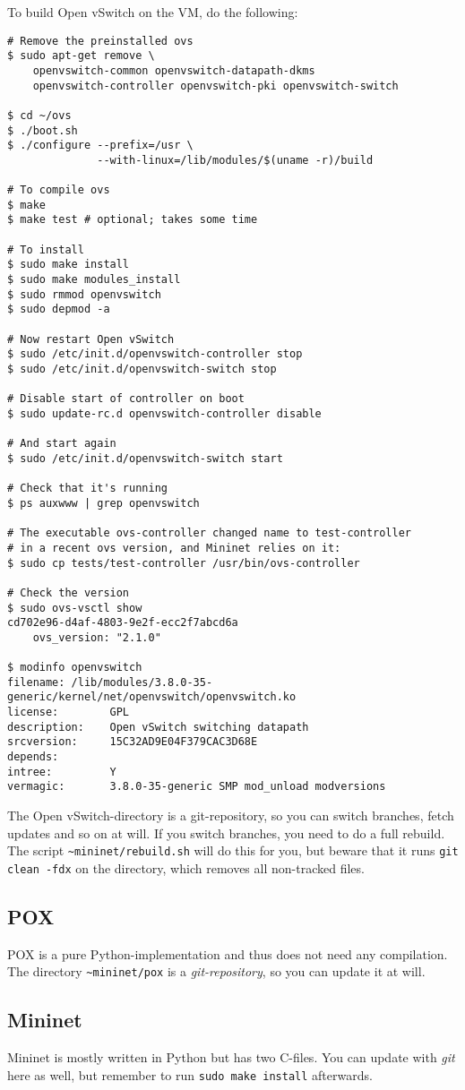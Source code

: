 To build Open vSwitch on the VM, do the following:

\begin{Verbatim}
# Remove the preinstalled ovs
$ sudo apt-get remove \
    openvswitch-common openvswitch-datapath-dkms
    openvswitch-controller openvswitch-pki openvswitch-switch

$ cd ~/ovs
$ ./boot.sh
$ ./configure --prefix=/usr \
              --with-linux=/lib/modules/$(uname -r)/build

# To compile ovs
$ make
$ make test # optional; takes some time

# To install
$ sudo make install
$ sudo make modules_install
$ sudo rmmod openvswitch
$ sudo depmod -a

# Now restart Open vSwitch
$ sudo /etc/init.d/openvswitch-controller stop
$ sudo /etc/init.d/openvswitch-switch stop

# Disable start of controller on boot
$ sudo update-rc.d openvswitch-controller disable

# And start again
$ sudo /etc/init.d/openvswitch-switch start

# Check that it's running
$ ps auxwww | grep openvswitch

# The executable ovs-controller changed name to test-controller
# in a recent ovs version, and Mininet relies on it:
$ sudo cp tests/test-controller /usr/bin/ovs-controller

# Check the version
$ sudo ovs-vsctl show
cd702e96-d4af-4803-9e2f-ecc2f7abcd6a
    ovs_version: "2.1.0"

$ modinfo openvswitch
filename: /lib/modules/3.8.0-35-generic/kernel/net/openvswitch/openvswitch.ko
license:        GPL
description:    Open vSwitch switching datapath
srcversion:     15C32AD9E04F379CAC3D68E
depends:
intree:         Y
vermagic:       3.8.0-35-generic SMP mod_unload modversions
\end{Verbatim}

The Open vSwitch-directory is a git-repository, so you can switch branches,
fetch updates and so on at will. If you switch
branches, you need to do a full rebuild. The script
\texttt{\~{}mininet/rebuild.sh} will do this for you, but beware that it
runs \texttt{git clean -fdx} on the directory, which removes all non-tracked
files\index{git!clean}.

\subsection{POX}

POX is a pure Python-implementation and thus does not need any
compilation.  The directory \texttt{\~{}mininet/pox} is a
\textit{git-repository}\index{git!POX}, so you can update it at will.

\subsection{Mininet}

Mininet is mostly written in Python but has two C-files. You can update with
\textit{git} here as well, but remember to run \texttt{sudo make install}
afterwards\index{git!Mininet}.

